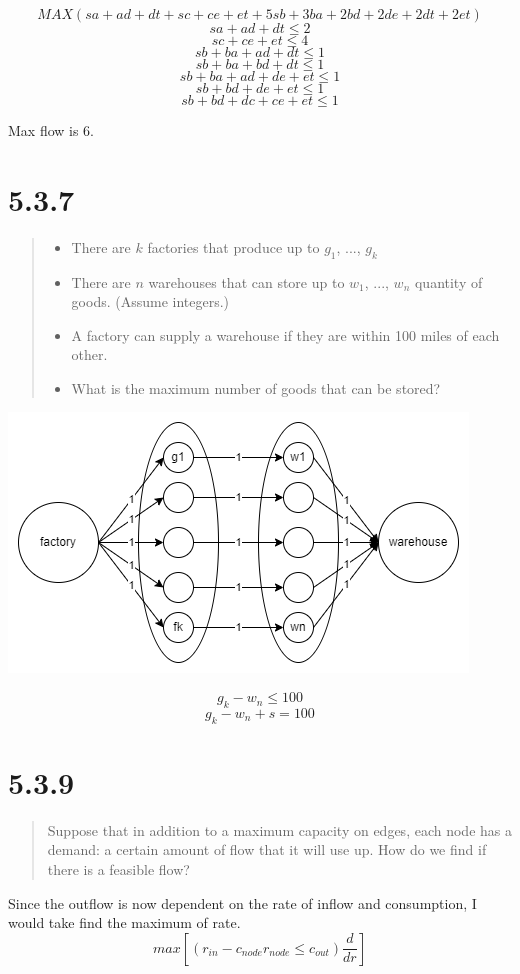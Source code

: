 \documentclass[12pt, letterpaper, twoside]{article}
\begin{document}
$$MAX(sa+ad+dt+sc+ce+et+5sb+3ba+2bd+2de+2dt+2et)$$
$$sa+ad+dt\le{2}$$
$$sc+ce+et\le{4}$$
$$sb+ba+ad+dt\le{1}$$
$$sb+ba+bd+dt\le{1}$$
$$sb+ba+ad+de+et\le{1}$$
$$sb+bd+de+et\le{1}$$
$$sb+bd+dc+ce+et\le{1}$$

Max flow is 6.

\newpage
\section*{5.3.7}
\begin{quote}
  \begin{itemize}
    \item There are $k$ factories that produce up to $g_1$, ..., $g_k$
    \item There are $n$ warehouses that can store up to $w_1$, ..., $w_n$ quantity of goods. (Assume integers.)
    \item A factory can supply a warehouse if they are within 100 miles of each other.
    \item What is the maximum number of goods that can be stored?
  \end{itemize}
\end{quote}
\begin{center}
  \includegraphics[scale=.75]{5_3_7_biparate_graph.png}
\end{center}
$$g_k-w_n\le{100}$$
$$g_k-w_n+s=100$$

\newpage
\section*{5.3.9}
\begin{quote}
  Suppose that in addition to a maximum capacity on edges, each node has a demand: a certain amount of flow that it will use up. How do we find if there is a feasible flow?
\end{quote}

Since the outflow is now dependent on the rate of inflow and consumption, I would take find the maximum
of rate.
$$max[(r_{in}-c_{node}r_{node}\le{c_{out}})\frac{d}{dr}]$$
\end{document}

